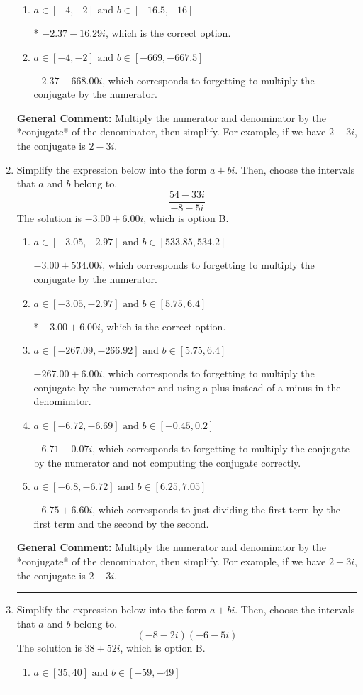 \documentclass{extbook}[14pt]
\newcommand{\litem}[1]{\item #1

\rule{\textwidth}{0.4pt}}
\begin{document}
\begin{enumerate}
{\begin{enumerate}[label=\Alph*.]
 $-97.00  - 16.29 i$, which corresponds to forgetting to multiply the conjugate by the numerator and using a plus instead of a minus in the denominator.
\item \( a \in [-4, -2] \text{ and } b \in [-16.5, -16] \)

* $-2.37  - 16.29 i$, which is the correct option.
\item \( a \in [-4, -2] \text{ and } b \in [-669, -667.5] \)

 $-2.37  - 668.00 i$, which corresponds to forgetting to multiply the conjugate by the numerator.
\end{enumerate}

\textbf{General Comment:} Multiply the numerator and denominator by the *conjugate* of the denominator, then simplify. For example, if we have $2+3i$, the conjugate is $2-3i$.
}
\litem{
Simplify the expression below into the form $a+bi$. Then, choose the intervals that $a$ and $b$ belong to.
\[ \frac{54 - 33 i}{-8 - 5 i} \]The solution is \( -3.00  + 6.00 i \), which is option B.\begin{enumerate}[label=\Alph*.]
\item \( a \in [-3.05, -2.97] \text{ and } b \in [533.85, 534.2] \)

 $-3.00  + 534.00 i$, which corresponds to forgetting to multiply the conjugate by the numerator.
\item \( a \in [-3.05, -2.97] \text{ and } b \in [5.75, 6.4] \)

* $-3.00  + 6.00 i$, which is the correct option.
\item \( a \in [-267.09, -266.92] \text{ and } b \in [5.75, 6.4] \)

 $-267.00  + 6.00 i$, which corresponds to forgetting to multiply the conjugate by the numerator and using a plus instead of a minus in the denominator.
\item \( a \in [-6.72, -6.69] \text{ and } b \in [-0.45, 0.2] \)

 $-6.71  - 0.07 i$, which corresponds to forgetting to multiply the conjugate by the numerator and not computing the conjugate correctly.
\item \( a \in [-6.8, -6.72] \text{ and } b \in [6.25, 7.05] \)

 $-6.75  + 6.60 i$, which corresponds to just dividing the first term by the first term and the second by the second.
\end{enumerate}

\textbf{General Comment:} Multiply the numerator and denominator by the *conjugate* of the denominator, then simplify. For example, if we have $2+3i$, the conjugate is $2-3i$.
}
\litem{
Simplify the expression below into the form $a+bi$. Then, choose the intervals that $a$ and $b$ belong to.
\[ (-8 - 2 i)(-6 - 5 i) \]The solution is \( 38 + 52 i \), which is option B.\begin{enumerate}[label=\Alph*.]
\item \( a \in [35, 40] \text{ and } b \in [-59, -49] \)


\end{enumerate}}
\end{enumerate}
\end{document}
